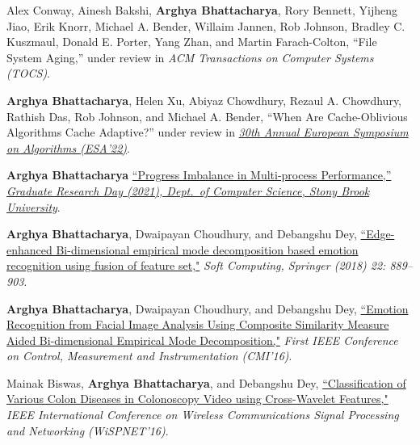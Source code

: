 \documentclass[letterpaper,10pt]{article}
\begin{document}

\item {Alex Conway, Ainesh Bakshi, \textbf{Arghya Bhattacharya}, Rory Bennett, Yijheng Jiao, Erik Knorr, Michael A. Bender, Willaim Jannen, Rob Johnson, Bradley C. Kuszmaul, Donald E. Porter, Yang Zhan, and Martin Farach-Colton, {``File System Aging,''} under review in \textit{ACM Transactions on Computer Systems (TOCS)}.}

\item {\textbf{Arghya Bhattacharya}, Helen Xu, Abiyaz Chowdhury, Rezaul A. Chowdhury, Rathish Das, Rob Johnson, and Michael A. Bender, {``When Are Cache-Oblivious Algorithms Cache Adaptive?''} under review in \href{https://algo2022.eu/esa/}{\textit{30th Annual European Symposium on Algorithms (ESA'22)}}.}

\item {\textbf{Arghya Bhattacharya}
\href{https://www3.cs.stonybrook.edu/~grd/posters/GRD_2021_Poster_Arghya_Bhattacharya.pdf}{``Progress Imbalance in Multi-process Performance,''} \href{https://www3.cs.stonybrook.edu/~grd/index.html}{\textit{Graduate Research Day (2021), Dept.\ of Computer Science, Stony Brook University}}.}

\item {\textbf{Arghya Bhattacharya}, Dwaipayan Choudhury, and Debangshu Dey, \href{https://doi.org/10.1007/s00500-016-2395-4}{``Edge-enhanced Bi-dimensional empirical mode decomposition based emotion recognition using fusion of feature set,"} \textit{Soft Computing, Springer (2018) 22: 889--903}.}

\item {\textbf{Arghya Bhattacharya}, Dwaipayan Choudhury, and Debangshu Dey, \href{https://doi.org/10.1109/CMI.2016.7413766}{``Emotion Recognition from Facial Image Analysis Using Composite Similarity Measure Aided Bi-dimensional Empirical Mode Decomposition,"} \textit{First IEEE Conference on Control, Measurement and Instrumentation (CMI’16)}.}

\item {Mainak Biswas, \textbf{Arghya Bhattacharya}, and Debangshu Dey, \href{https://doi.org/10.1109/WiSPNET.2016.7566521} {``Classification of Various Colon Diseases in Colonoscopy Video using Cross-Wavelet Features,"} \textit{IEEE International Conference on Wireless Communications Signal Processing and Networking (WiSPNET'16)}.}
\resumeSubHeadingListEnd
\end{document}
